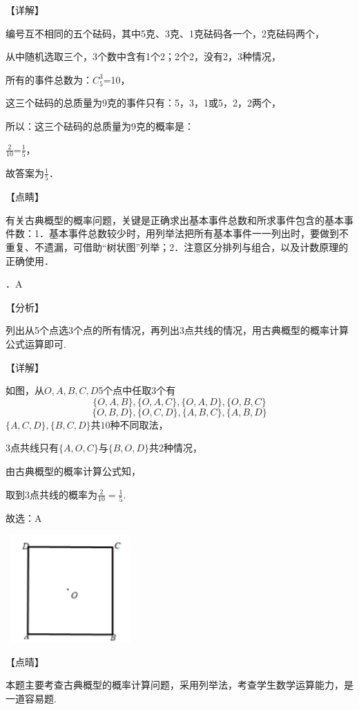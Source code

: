 \documentclass[a4paper,11pt,UTF8,twoside]{ctexart} %
\begin{document}
\noindent 【详解】

\noindent 编号互不相同的五个砝码，其中5克、3克、1克砝码各一个，2克砝码两个，

\noindent 从中随机选取三个，3个数中含有1个2；2个2，没有2，3种情况，

\noindent 所有的事件总数为：$C_{5}^{3} $=10，

\noindent 这三个砝码的总质量为9克的事件只有：5，3，1或5，2，2两个，

\noindent 所以：这三个砝码的总质量为9克的概率是：

\noindent $\frac{2}{10} $=$\frac{1}{5} $，

\noindent 故答案为$\frac{1}{5} $．

\noindent 【点睛】

\noindent 有关古典概型的概率问题，关键是正确求出基本事件总数和所求事件包含的基本事件数：1．基本事件总数较少时，用列举法把所有基本事件一一列出时，要做到不重复、不遗漏，可借助``树状图''列举；2．注意区分排列与组合，以及计数原理的正确使用．

．A

\noindent 【分析】

\noindent 列出从5个点选3个点的所有情况，再列出3点共线的情况，用古典概型的概率计算公式运算即可.

\noindent 【详解】

\noindent 如图，从$O,A,B,C,D$5个点中任取3个有
\[\{ O,A,B\} ,\{ O,A,C\} ,\{ O,A,D\} ,\{ O,B,C\} \] 
\[\{ O,B,D\} ,\{ O,C,D\} ,\{ A,B,C\} ,\{ A,B,D\} \] 
$\{ A,C,D\} ,\{ B,C,D\} $共$10$种不同取法，

\noindent 3点共线只有$\{ A,O,C\} $与$\{ B,O,D\} $共2种情况，

\noindent 由古典概型的概率计算公式知，

\noindent 取到3点共线的概率为$\frac{2}{10} =\frac{1}{5} $.

\noindent 故选：A

\noindent \includegraphics*[width=1.96in, height=1.62in, keepaspectratio=false, trim=0.00in 0.09in 0.00in 0.11in]{image292}

\noindent 【点晴】

\noindent 本题主要考查古典概型的概率计算问题，采用列举法，考查学生数学运算能力，是一道容易题.
\end{document}
